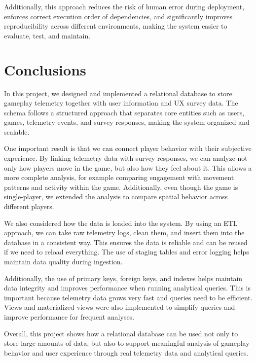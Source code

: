 \documentclass[11pt]{article}
\begin{document}
Additionally, this approach reduces the risk of human error during deployment, enforces correct execution order of dependencies, and significantly improves reproducibility across different environments, making the system easier to evaluate, test, and maintain.

\section{Conclusions}
\medskip In this project, we designed and implemented a relational database to store gameplay telemetry together with user information and UX survey data. The schema follows a structured approach that separates core entities such as users, games, telemetry events, and survey responses, making the system organized and scalable.

\medskip One important result is that we can connect player behavior with their subjective experience. By linking telemetry data with survey responses, we can analyze not only how players move in the game, but also how they feel about it. This allows a more complete analysis, for example comparing engagement with movement patterns and activity within the game. Additionally, even though the game is single-player, we extended the analysis to compare spatial behavior across different players.

\medskip We also considered how the data is loaded into the system. By using an ETL approach, we can take raw telemetry logs, clean them, and insert them into the database in a consistent way. This ensures the data is reliable and can be reused if we need to reload everything. The use of staging tables and error logging helps maintain data quality during ingestion.

\medskip Additionally, the use of primary keys, foreign keys, and indexes helps maintain data integrity and improves performance when running analytical queries. This is important because telemetry data grows very fast and queries need to be efficient. Views and materialized views were also implemented to simplify queries and improve performance for frequent analyses.

\medskip Overall, this project shows how a relational database can be used not only to store large amounts of data, but also to support meaningful analysis of gameplay behavior and user experience through real telemetry data and analytical queries.

\appendix
\end{document}

